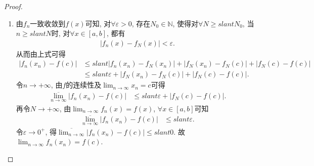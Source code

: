 \documentclass[../../main.tex]{subfiles}
\begin{document}
\begin{proof}
\begin{enumerate}
\item 由\(f_n\)一致收敛到\(f(x)\)可知, 对\(\forall \varepsilon > 0\), 存在\(N_0\in \mathbb{N}\), 使得对\(\forall N\geqslant slant N_0\), 当\(n\geqslant slant N\)时, 对\(\forall x\in [a,b]\), 都有
\begin{align*}
|f_n(x) - f_N(x)| < \varepsilon.
\end{align*}
从而由上式可得
\begin{align*}
|f_n(x_n) - f(c)| &\leqslant slant |f_n(x_n) - f_N(x_n)| + |f_N(x_n) - f_N(c)| + |f_N(c) - f(c)|\\
&\leqslant slant \varepsilon + |f_N(x_n) - f_N(c)| + |f_N(c) - f(c)|.
\end{align*}
令\(n\rightarrow +\infty\), 由\(f\)的连续性及\(\lim_{n\rightarrow \infty}x_n = c\)可得
\begin{align*}
\overline{\lim_{n\rightarrow \infty}}|f_n(x_n) - f(c)| &\leqslant slant \varepsilon + |f_N(c) - f(c)|.
\end{align*}
再令\(N\rightarrow +\infty\), 由\(\lim_{n\rightarrow \infty}f_n(x) = f(x)\), \(\forall x\in [a,b]\)可知
\begin{align*}
\overline{\lim_{n\rightarrow \infty}}|f_n(x_n) - f(c)| &\leqslant slant \varepsilon.
\end{align*}
令\(\varepsilon \rightarrow 0^+\), 得\(\overline{\lim_{n\rightarrow \infty}}|f_n(x_n) - f(c)| \leqslant slant 0\). 故\(\lim_{n\rightarrow \infty}f_n(x_n) = f(c)\). 


\end{enumerate}
\end{proof}
\end{document}
